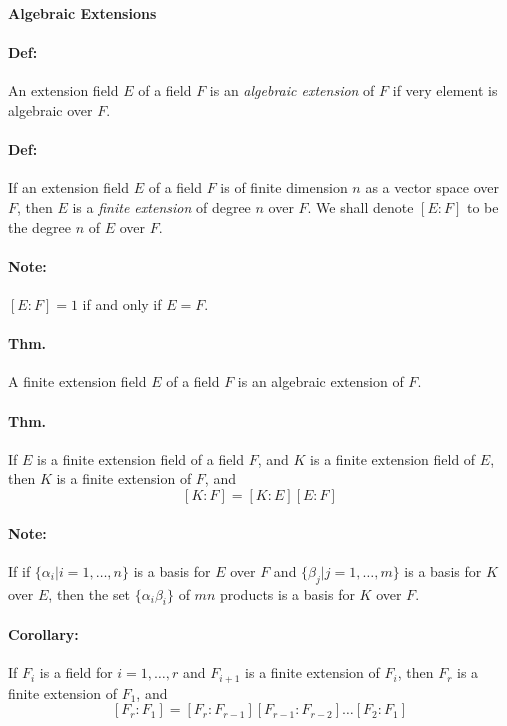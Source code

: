 \documentclass[10pt,a4paper]{article}
\begin{document}
\begin{center}
\textbf{Algebraic Extensions}
\end{center}

\paragraph{Def:} An extension field $E$ of a field $F$ is an \textit{algebraic extension} of $F$ if very element is algebraic over $F$.

\paragraph{Def:} If an extension field $E$ of a field $F$ is of finite dimension $n$ as a vector space over $F$, then $E$ is a \textit{finite extension} of degree $n$ over $F$. We shall denote $[E:F]$ to be the degree $n$ of $E$ over $F$.

\paragraph{Note:} $[E:F] = 1$ if and only if $E=F$.

\paragraph{Thm.} A finite extension field $E$ of a field $F$ is an algebraic extension of $F$.

\paragraph{Thm.}  If $E$ is a finite extension field of a field $F$, and $K$ is a finite extension field of $E$, then $K$ is a finite extension of $F$, and 
$$ [K:F] = [K:E][E:F]$$

\paragraph{Note:} If if $\{ \alpha_i | i = 1,\dots,n\}$ is a basis for $E$ over $F$ and $\{ \beta_j | j=1,\dots,m\}$ is a basis for $K$ over $E$, then the set $\{\alpha_i\beta_i\}$ of $mn$ products is a basis for $K$ over $F$.

\paragraph{Corollary:} If $F_i$ is a field for $i=1,\dots,r$ and $F_{i+1}$ is a finite extension of $F_i$, then $F_r$ is a finite extension of $F_1$, and
$$ [F_r:F_1] = [F_r:F_{r-1}][F_{r-1}:F_{r-2}]\dots[F_2:F_1]$$
\end{document}
